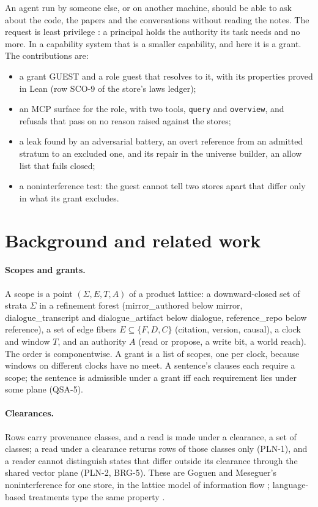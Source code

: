 \documentclass[11pt]{article}
\theoremstyle{plain}
\theoremstyle{definition}
\theoremstyle{remark}
\newcommand{\str}[1]{\textsf{#1}}
\begin{document}
An agent run by someone else, or on another machine, should be able to ask about the code, the
papers and the conversations without reading the notes. The request is least privilege
\citep{saltzer1975protection}: a principal holds the authority its task needs and no more. In a
capability system \citep{dennis1966semantics} that is a smaller capability, and here it is a
grant. The contributions are:
\begin{itemize}
  \item a grant \str{GUEST} and a role \str{guest} that resolves to it, with its properties proved
        in Lean (row SCO-9 of the store's laws ledger);
  \item an MCP surface \citep{mcp2025} for the role, with two tools, \texttt{query} and
        \texttt{overview}, and refusals that pass on no reason raised against the stores;
  \item a leak found by an adversarial battery, an overt reference from an admitted stratum to an
        excluded one, and its repair in the universe builder, an allow list that fails closed;
  \item a noninterference test: the guest cannot tell two stores apart that differ only in what
        its grant excludes.
\end{itemize}

\section{Background and related work}

\paragraph{Scopes and grants.}
A scope is a point $(\Sigma, E, T, A)$ of a product lattice: a downward-closed set of strata
$\Sigma$ in a refinement forest (\str{mirror\_authored} below \str{mirror},
\str{dialogue\_transcript} and \str{dialogue\_artifact} below \str{dialogue},
\str{reference\_repo} below \str{reference}), a set of edge fibers $E \subseteq \{F, D, C\}$
(citation, version, causal), a clock and window $T$, and an authority $A$ (read or propose, a
write bit, a world reach). The order is componentwise. A grant is a list of scopes, one per
clock, because windows on different clocks have no meet. A sentence's clauses each require a
scope; the sentence is admissible under a grant iff each requirement lies under some plane
(QSA-5).

\paragraph{Clearances.}
Rows carry provenance classes, and a read is made under a clearance, a set of classes; a read
under a clearance returns rows of those classes only (PLN-1), and a reader cannot distinguish
states that differ outside its clearance through the shared vector plane (PLN-2, BRG-5). These
are Goguen and Meseguer's noninterference \citep{goguen1982security} for one store, in the
lattice model of information flow \citep{denning1976lattice}; language-based treatments type the
same property \citep{volpano1996sound,sabelfeld2003language}.
\end{document}
